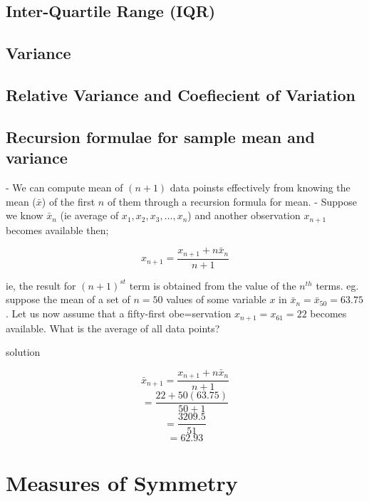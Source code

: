 \documentclass[12pt,a4paper]{article}
\begin{document}
\subsection{Inter-Quartile Range (IQR)}
\subsection{Variance}
\subsection{Relative Variance and Coefiecient of Variation}
\subsection{Recursion formulae for sample mean and variance}
- We can compute mean of $(n + 1)$ data poinsts effectively from knowing the mean ($\bar{x}$) of the first $n$ of them through a recursion formula for mean.
- Suppose we know $\bar{x}_{n}$ (ie average of $x_1, x_2, x_3, \dots, x_n$) and another observation $x_{n+1}$ becomes available then;

\begin{equation}
    x_{n + 1} = \frac{x_{n+1} + n\bar{x}_n}{n + 1}
\end{equation}

ie, the result for $(n + 1)^{st}$ term is obtained from the value of the $n^{th}$ terms.
eg. suppose the mean of a set of $n = 50$ values of some variable $x$ in $\bar{x}_n = \bar{x}_{50} = 63.75$. Let us now assume that a fifty-first obe=servation $x_{n + 1} = x_{61} = 22$ becomes available. What is the average of all data points?

solution



\begin{center}
    \[\bar{x}_{n + 1} = \frac{x_{n+1} + n\bar{x}_n}{n + 1}\]
    \[= \frac{22 + 50(63.75)}{50 + 1}\]
    \[= \frac{3209.5}{51}\]
    \[= 62.93\]
\end{center}


\section{Measures of Symmetry}
\end{document}
